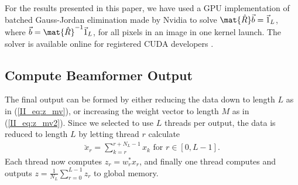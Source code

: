For the results presented in this paper, we have used a GPU implementation of batched Gauss-Jordan elimination made by Nvidia to solve $\mat{\hat{R}}\vec{b} = \vec{1}_L$, where $\vec{b} = \mat{\hat{R}}^{-1}\vec{1}_L$, for all pixels in an image in one kernel launch. The solver is available online for registered CUDA developers \cite{Nvidiaa}.%





\subsection{Compute Beamformer Output}
The final output can be formed by either reducing the data down to length $L$ as in (\ref{II_eq:z_mv}), or increasing the weight vector to length $M$ as in (\ref{II_eq:z_mv2}). Since we selected to use $L$ threads per output, the data is reduced to length $L$ by letting thread $r$ calculate
%
\begin{align}\label{II_eq:subsum}
\breve{x}_{r} = \sum_{k=r}^{r+N_L-1}x_{k} \text{ for } r \in [0, L-1].
\end{align}
%
Each thread now computes $z_r = w_r^*x_r$, and finally one thread computes and outputs $z = \frac{1}{N_L}\sum_{r=0}^{L-1} z_r$ to global memory. %


